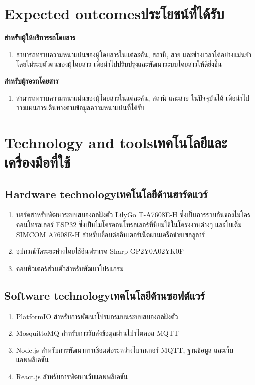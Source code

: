 \section{\ifenglish Expected outcomes\else ประโยชน์ที่ได้รับ\fi}
\textbf{สำหรับผู้ให้บริการรถโดยสาร}
\begin{enumerate}
    \item สามารถทราบความหนาแน่นของผู้โดยสารในแต่ละคัน, สถานี, สาย และช่วงเวลาได้อย่างแม่นยำโดยไม่ระบุตัวตนของผู้โดยสาร เพื่อนำไปปรับปรุงและพัฒนาระบบโดยสารให้ดียิ่งขึ้น
\end{enumerate}
\textbf{สำหรับผู้รอรถโดยสาร}
\begin{enumerate}
    \item สามารถทราบความหนาแน่นของผู้โดยสารในแต่ละคัน, สถานี และสาย ในปัจจุบันได้ เพื่อนำไปวางแผนการเดินทางตามข้อมูลความหนาแน่นที่ได้รับ
\end{enumerate}

\section{\ifenglish Technology and tools\else เทคโนโลยีและเครื่องมือที่ใช้\fi}

\subsection{\ifenglish Hardware technology\else เทคโนโลยีด้านฮาร์ดแวร์\fi}
\begin{enumerate}
    \item บอร์ดสำหรับพัฒนาระบบสมองกลฝังตัว LilyGo T-A7608E-H ซึ่งเป็นการรวมกันของไมโครคอนโทรลเลอร์ ESP32 ซึ่งเป็นไมโครคอนโทรลเลอร์ที่นิยมใช้ในโครงงานต่างๆ และโมเด็ม SIMCOM A7608E-H สำหรับเชื่อมต่ออินเตอร์เน็ตผ่านเครือข่ายเซลลูลาร์
    \item อุปกรณ์วัดระยะห่างโดยใช้อินฟราเรด Sharp GP2Y0A02YK0F
    \item คอมพิวเตอร์ส่วนตัวสำหรับพัฒนาโปรแกรม
\end{enumerate}

\subsection{\ifenglish Software technology\else เทคโนโลยีด้านซอฟต์แวร์\fi}
\begin{enumerate}
    \item PlatformIO สำหรับการพัฒนาโปรแกรมบนระบบสมองกลฝังตัว
    \item MosquittoMQ สำหรับการรับส่งข้อมูลผ่านโปรโตคอล MQTT
    \item Node.js สำหรับการพัฒนาการเชื่อมต่อระหว่างโบรกเกอร์ MQTT, ฐานข้อมูล และเว็บแอพพลิเคชัน
    \item React.js สำหรับการพัฒนาเว็บแอพพลิเคชัน
\end{enumerate}

